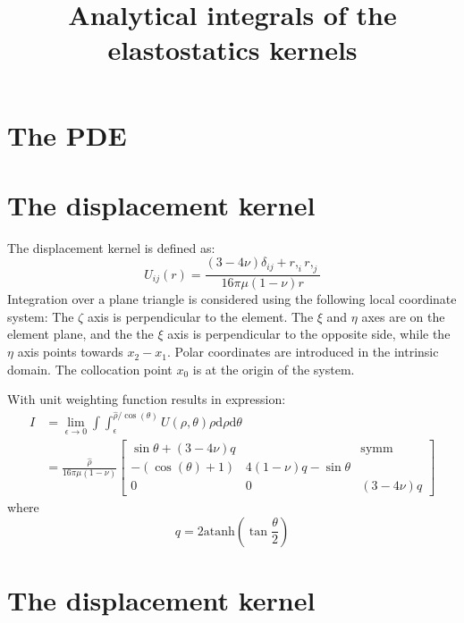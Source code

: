 \documentclass{article}
\title{Analytical integrals of the elastostatics kernels}
\newcommand{\atanh}{\mathrm{atanh}}
\newcommand{\td}{\mathrm{d}}
\begin{document}
\maketitle

\section{The PDE}

\section{The displacement kernel}

The displacement kernel is defined as:
%
\begin{equation}
U_{ij}(r) = \frac{(3-4\nu)\delta_{ij} + r,_i r,_j}{16\pi\mu(1-\nu)r}
\end{equation}
%
Integration over a plane triangle is considered using the following local coordinate system:
The $\zeta$ axis is perpendicular to the element. The $\xi$ and $\eta$ axes are on the element plane, and the the $\xi$ axis is perpendicular to the opposite side, while the $\eta$ axis points towards $x_2-x_1$. Polar coordinates are introduced in the intrinsic domain. The collocation point $x_0$ is at the origin of the system.

With unit weighting function  results in expression:
%
\begin{align}
I &= \lim_{\epsilon\to 0} \int \int_{\epsilon}^{\hat{\rho}/\cos(\theta)} U(\rho,\theta) \rho \td \rho \td \theta \nonumber \\
&= \frac{\hat{\rho}}{16\pi\mu(1-\nu)}
\begin{bmatrix}
\sin\theta + (3-4\nu) q &  &  \text{symm} \\ 
- \left(\cos\!\left(\theta\right) + 1\right) &  4 (1-\nu) q - \sin\theta & \\
0 & 0 & \left(3-4\nu\right)q 
\end{bmatrix}
\end{align}
%
where
%
\begin{equation}
q = 2 \atanh\left(\tan\frac{\theta}{2}\right)
\end{equation}

\section{The displacement kernel}
\end{document}
